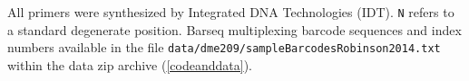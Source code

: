 All primers were synthesized by Integrated DNA Technologies (IDT).
\texttt{N} refers to a standard degenerate position.
\label{tab:indexbarcodes}
Barseq multiplexing barcode sequences and index numbers available in 
the file 
\texttt{data/dme209/sampleBarcodesRobinson2014.txt} within the
data zip archive (\autoref{codeanddata}). \\



